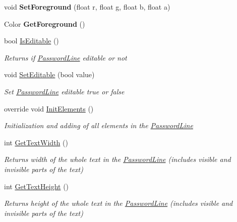 \begin{DoxyCompactItemize}
void {\bfseries Set\+Foreground} (float r, float g, float b, float a)
\item 
\mbox{\label{class_space_v_i_l_1_1_password_line_ab1ef605f2bf3a49e7ac03a24d7c1cccd}} 
Color {\bfseries Get\+Foreground} ()
\item 
bool \mbox{\hyperlink{class_space_v_i_l_1_1_password_line_a1defdc8c76e67ca62653ce1c06277e88}{Is\+Editable}} ()
\begin{DoxyCompactList}\small\item\em Returns if \mbox{\hyperlink{class_space_v_i_l_1_1_password_line}{Password\+Line}} editable or not \end{DoxyCompactList}\item 
void \mbox{\hyperlink{class_space_v_i_l_1_1_password_line_a51ffda354019718ff1118b55d8c6470e}{Set\+Editable}} (bool value)
\begin{DoxyCompactList}\small\item\em Set \mbox{\hyperlink{class_space_v_i_l_1_1_password_line}{Password\+Line}} editable true or false \end{DoxyCompactList}\item 
override void \mbox{\hyperlink{class_space_v_i_l_1_1_password_line_a2cea928d45c4c440435531abacbb5799}{Init\+Elements}} ()
\begin{DoxyCompactList}\small\item\em Initialization and adding of all elements in the \mbox{\hyperlink{class_space_v_i_l_1_1_password_line}{Password\+Line}} \end{DoxyCompactList}\item 
int \mbox{\hyperlink{class_space_v_i_l_1_1_password_line_ac2a6cfda053e0134ab1c139abb7709a3}{Get\+Text\+Width}} ()
\begin{DoxyCompactList}\small\item\em Returns width of the whole text in the \mbox{\hyperlink{class_space_v_i_l_1_1_password_line}{Password\+Line}} (includes visible and invisible parts of the text) \end{DoxyCompactList}\item 
int \mbox{\hyperlink{class_space_v_i_l_1_1_password_line_a6b936fd21b93ef5e5cccc503c8a63c3f}{Get\+Text\+Height}} ()
\begin{DoxyCompactList}\small\item\em Returns height of the whole text in the \mbox{\hyperlink{class_space_v_i_l_1_1_password_line}{Password\+Line}} (includes visible and invisible parts of the text) \end{DoxyCompactList}\item 

\end{DoxyCompactItemize}
